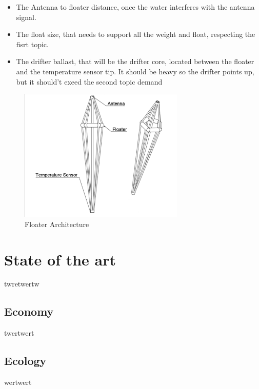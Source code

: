 \begin{itemize}
    \item The Antenna to floater distance, once the water interferes with the antenna signal.
    \item The float size, that needs to support all the weight and float, respecting the fisrt topic.
    \item The drifter ballast, that will be the drifter core, located between the 
    floater and the temperature sensor tip. It should be heavy so the drifter points up, but it should't exeed the 
    second topic demand 

\end{itemize}

\begin{figure}[H]
    \centering
    \includegraphics[width=0.7\textwidth]{images/diagrams/shell/unnamed.png}  %
    \caption{Floater Architecture}
    \label{fig:Floater Architecture}        
\end{figure}

\section{State of the art}
twretwertw
\subsection{Economy}
twertwert
\subsection{Ecology}
wertwert
